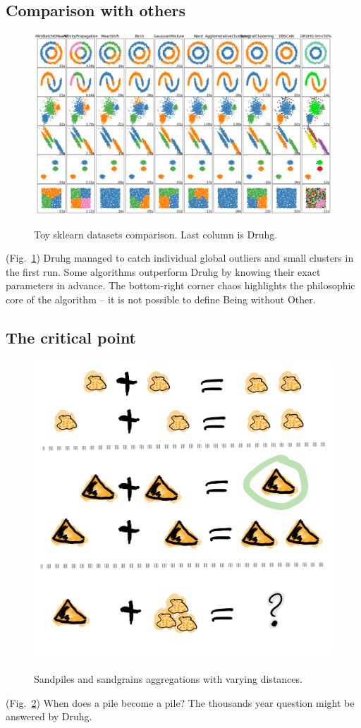 \documentclass[12pt, a4paper, twocolumn]{article}
\newcommand{\githubPics}{https://raw.githubusercontent.com/artamono1/druhg/master/papers/druhg/}
\begin{document}
\subsection{Comparison with others}
\begin{figure}[H]
  \centering
  \href{\githubPics run_comparison.png}{\includegraphics[width=0.8\linewidth]{run_comparison.png}}
  \caption{Toy sklearn datasets comparison. Last column is Druhg.} \label{fig:SklearnDatasets}
\end{figure}

(Fig.~\ref{fig:SklearnDatasets}) Druhg managed to catch individual global outliers and small clusters in the first run. Some algorithms outperform Druhg by knowing their exact parameters in advance.
The bottom-right corner chaos highlights the philosophic core of the algorithm -- it is not possible to define Being without Other.


\subsection{The critical point}

\begin{figure}[!htb]
  \centering
  \href{\githubPics pdn_sandpiles.png}{\includegraphics[width=0.5\linewidth]{pdn_sandpiles.png}}
  \caption{Sandpiles and sandgrains aggregations with varying distances.}\label{fig:Sand}
\end{figure}
(Fig.~\ref{fig:Sand}) When does a pile become a pile? The thousands year question might be answered by Druhg.
\end{document}
